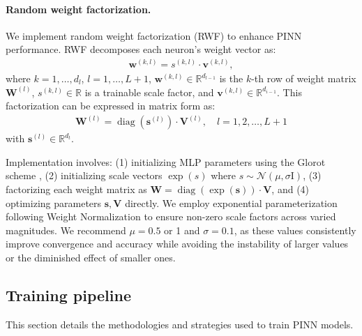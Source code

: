 \paragraph{Random weight factorization.} We implement random weight factorization (RWF) \cite{wang2022random} to enhance PINN performance. RWF decomposes each neuron's weight vector as:
\begin{align}
    \mathbf{w}^{(k, l)}=s^{(k, l)} \cdot \mathbf{v}^{(k, l)},
\end{align}
where $k=1,\ldots,d_l$, $l=1,\ldots,L+1$, $\mathbf{w}^{(k, l)} \in \mathbb{R}^{d_{l-1}}$ is the $k$-th row of weight matrix $\mathbf{W}^{(l)}$, $s^{(k, l)} \in \mathbb{R}$ is a trainable scale factor, and $\mathbf{v}^{(k, l)} \in \mathbb{R}^{d_{i-1}}$. This factorization can be expressed in matrix form as:
\begin{align}
    \mathbf{W}^{(l)}=\operatorname{diag}\left(\mathbf{s}^{(l)}\right) \cdot \mathbf{V}^{(l)}, \quad l=1,2, \ldots, L+1
\end{align}
with $\mathbf{s}^{(l)} \in \mathbb{R}^{d_t}$.

Implementation involves: (1) initializing MLP parameters using the Glorot scheme \cite{glorot2010understanding}, (2) initializing scale vectors $\exp(s)$ where $s \sim \mathcal{N}(\mu, \sigma \mathrm{I})$, (3) factorizing each weight matrix as $\mathbf{W}=\operatorname{diag}(\exp (\mathbf{s})) \cdot \mathbf{V}$, and (4) optimizing parameters $\mathbf{s}, \mathbf{V}$ directly. We employ exponential parameterization following Weight Normalization \cite{salimans2016weight} to ensure non-zero scale factors across varied magnitudes. We recommend $\mu=0.5$ or 1 and $\sigma=0.1$, as these values consistently improve convergence and accuracy while avoiding the instability of larger values or the diminished effect of smaller ones.



\subsection{Training pipeline}
\label{appendix:training}

This section details the methodologies and strategies used to train PINN models.

